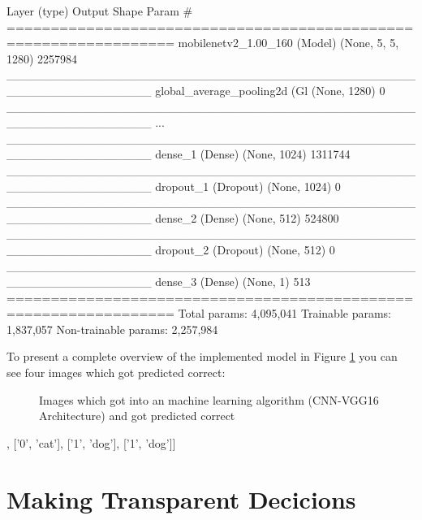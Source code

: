 \begin{python}[label={lst:cnn_summary_after}, caption={Model summary before adding layers for the prediction of probabilities}]
Layer (type)                 Output Shape              Param #   
=================================================================
mobilenetv2_1.00_160 (Model) (None, 5, 5, 1280)        2257984   
_________________________________________________________________
global_average_pooling2d (Gl (None, 1280)              0         
_________________________________________________________________
...         
_________________________________________________________________
dense_1 (Dense)              (None, 1024)              1311744   
_________________________________________________________________
dropout_1 (Dropout)          (None, 1024)              0         
_________________________________________________________________
dense_2 (Dense)              (None, 512)               524800    
_________________________________________________________________
dropout_2 (Dropout)          (None, 512)               0         
_________________________________________________________________
dense_3 (Dense)              (None, 1)                 513       
=================================================================
Total params: 4,095,041
Trainable params: 1,837,057
Non-trainable params: 2,257,984
\end{python}



To present a complete overview of the implemented model in Figure \ref{fig:to_predcit} you can see four images which got predicted correct:

\begin{figure}[!htp]
	\centering
	\caption{Images which got into an machine learning algorithm (CNN-VGG16 Architecture) and got predicted correct}
	\label{fig:to_predcit}
\end{figure}

\begin{python}[label={pred}, caption={Predictions of the pretrained VGG-16 Architecture CNN model}]
[['0', 'cat'], 
['0', 'cat'], 
['1', 'dog'], 
['1', 'dog']]
\end{python}

\section{Making Transparent Decicions}

